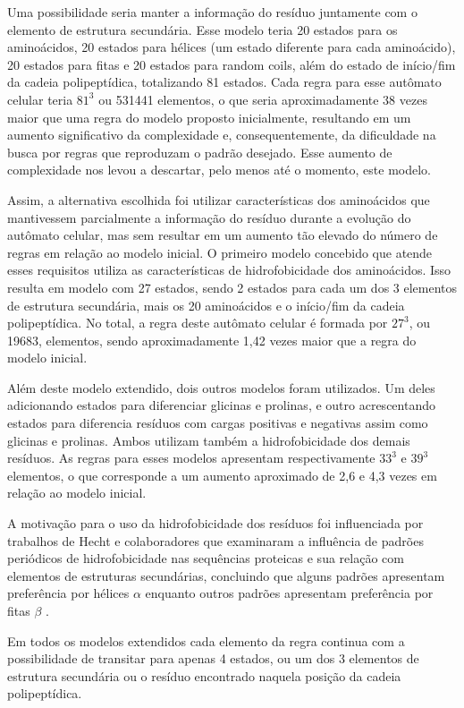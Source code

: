 Uma possibilidade seria manter a informação do resíduo juntamente com o elemento de estrutura secundária. Esse modelo teria 20 estados para os aminoácidos, 20 estados para hélices (um estado diferente para cada aminoácido), 20 estados para fitas e 20 estados para random coils, além do estado de início/fim da cadeia polipeptídica, totalizando 81 estados. Cada regra para esse autômato celular teria $81^3$  ou 531441 elementos, o que seria aproximadamente 38 vezes maior que uma regra do modelo proposto inicialmente, resultando em um aumento significativo da complexidade e, consequentemente, da dificuldade na busca por regras que reproduzam o padrão desejado. Esse aumento de complexidade nos levou a descartar, pelo menos até o momento, este modelo.

Assim, a alternativa escolhida foi utilizar características dos aminoácidos que mantivessem parcialmente a informação do resíduo durante a evolução do autômato celular, mas sem resultar em um aumento tão elevado do número de regras em relação ao modelo inicial. O primeiro modelo concebido que atende esses requisitos utiliza as características de hidrofobicidade dos aminoácidos. Isso resulta em modelo com 27 estados, sendo 2 estados para cada um dos 3 elementos de estrutura secundária, mais os 20 aminoácidos e o início/fim da cadeia polipeptídica. No total, a regra deste autômato celular é formada por  $27^3$, ou 19683, elementos, sendo aproximadamente 1,42 vezes maior que a regra do modelo inicial.

Além deste modelo extendido, dois outros modelos foram utilizados. Um deles adicionando estados para diferenciar glicinas e prolinas, e outro acrescentando estados para diferencia resíduos com cargas positivas e negativas assim como glicinas e prolinas. Ambos utilizam também a hidrofobicidade dos demais resíduos. As regras para esses modelos apresentam  respectivamente $33^3$ e $39^3$ elementos, o que corresponde a um aumento aproximado de 2,6 e 4,3 vezes em relação ao modelo inicial. 

A motivação para o uso da hidrofobicidade dos resíduos foi influenciada por trabalhos de Hecht e colaboradores \cite{Xiong07, West1995} que examinaram a influência de padrões periódicos de hidrofobicidade nas sequências proteicas e sua relação com elementos de estruturas secundárias, concluindo que alguns padrões apresentam preferência por hélices $\alpha$ enquanto outros padrões apresentam preferência por fitas $\beta$ \cite{West1995}.

Em todos os modelos extendidos cada elemento da regra continua com a possibilidade de transitar para apenas 4 estados, ou um dos 3 elementos de estrutura secundária ou o resíduo encontrado naquela posição da cadeia polipeptídica.

